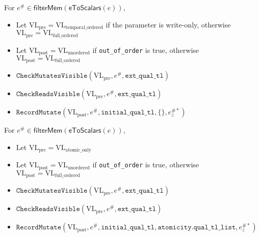 
For $e^\# \in \mathsf{filterMem}(\mathsf{eToScalars}(e))$,
\begin{itemize}
  \item Let $\mathrm{VL_{pre}} = \mathrm{VL_{temporal\_ordered}}$ if the parameter is write-only, otherwise $\mathrm{VL_{pre}} = \mathrm{VL_{full\_ordered}}$
  \item Let $\mathrm{VL_{post}} = \mathrm{VL_{unordered}}$ if \texttt{out\_of\_order} is true, otherwise $\mathrm{VL_{post}} = \mathrm{VL_{full\_ordered}}$
  \item $\texttt{CheckMutatesVisible}(\mathrm{VL_{pre}}, e^\#, \texttt{ext\_qual\_tl})$
  \item $\texttt{CheckReadsVisible}(\mathrm{VL_{pre}}, e^\#, \texttt{ext\_qual\_tl})$
  \item $\texttt{RecordMutate}(\mathrm{VL_{post}}, e^\#, \texttt{initial\_qual\_tl}, \{\}, e_z^{\#*})$
\end{itemize}


For $e^\# \in \mathsf{filterMem}(\mathsf{eToScalars}(e))$,
\begin{itemize}
  \item Let $\mathrm{VL_{pre}} = \mathrm{VL_{atomic\_only}}$
  \item Let $\mathrm{VL_{post}} = \mathrm{VL_{unordered}}$ if \texttt{out\_of\_order} is true, otherwise $\mathrm{VL_{post}} = \mathrm{VL_{full\_ordered}}$
  \item $\texttt{CheckMutatesVisible}(\mathrm{VL_{pre}}, e^\#, \texttt{ext\_qual\_tl})$
  \item $\texttt{CheckReadsVisible}(\mathrm{VL_{pre}}, e^\#, \texttt{ext\_qual\_tl})$
  \item $\texttt{RecordMutate}(\mathrm{VL_{post}}, e^\#, \texttt{initial\_qual\_tl}, \texttt{atomicity.qual\_tl\_list}, e_z^{\#*})$
\end{itemize}


